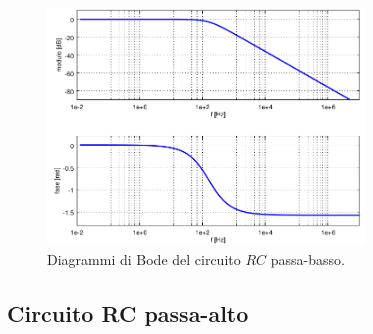 \begin{figure}[H]
    \centering
    \includegraphics[width=0.75\textwidth]{Immagini/DiagrammiBodePassaBasso.png}
    \caption{Diagrammi di Bode del circuito $RC$ passa-basso.}
    \label{figure: DiagrammiBodePassaBasso}
\end{figure}

\subsection{Circuito RC passa-alto}

